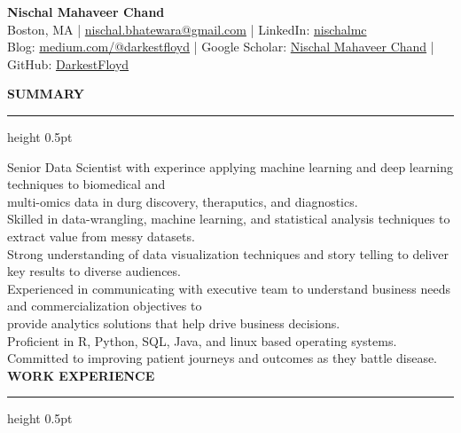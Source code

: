 \documentclass[a4paper]{article}
\newcommand{\myline}{\par
  \kern2pt %
  \hrule height 0.5pt
  \kern2pt %
}
\newcommand{\mybullet}{
	\indent 
  \textbullet \hspace*{2mm}
}
\begin{document}
	\begin{center}
		{\LARGE \textbf{Nischal Mahaveer Chand}} \\
    Boston, MA | 
    \href{mailto:nischal.bhatewara@gmail.com}{nischal.bhatewara@gmail.com} | 
    LinkedIn: \href{https://www.linkedin.com/in/nischalmc}{nischalmc} \\
		Blog: \href{https://medium.com/@darkestfloyd}{medium.com/@darkestfloyd} |
    Google Scholar: \href{https://scholar.google.com/citations?user=G8ALRj8AAAAJ}{Nischal Mahaveer Chand} |
                GitHub: \href{https://github.com/darkestfloyd}{DarkestFloyd} \\
	\end{center}

  \smallskip
  \smallskip
	\noindent
	{\large \textbf{SUMMARY}}
	\myline 
	\smallskip

  \mybullet Senior Data Scientist with experince applying machine learning and deep learning techniques to biomedical and \\\hspace*{10mm}multi-omics data in durg discovery, theraputics, and diagnostics. \\
  \mybullet Skilled in data-wrangling, machine learning, and statistical analysis techniques to extract value from messy datasets. \\
  \mybullet Strong understanding of data visualization techniques and story telling to deliver key results to diverse audiences. \\
  \mybullet Experienced in communicating with executive team to understand business needs and commercialization objectives to \\\hspace*{10mm}provide analytics solutions that help drive business decisions. \\
  \mybullet Proficient in R, Python, SQL, Java, and linux based operating systems. \\ 
  \mybullet Committed to improving patient journeys and outcomes as they battle disease. \\

	\smallskip
	\smallskip
	\noindent
	{\large \textbf{WORK EXPERIENCE}}
	\myline 
	\smallskip
	
\end{document}
